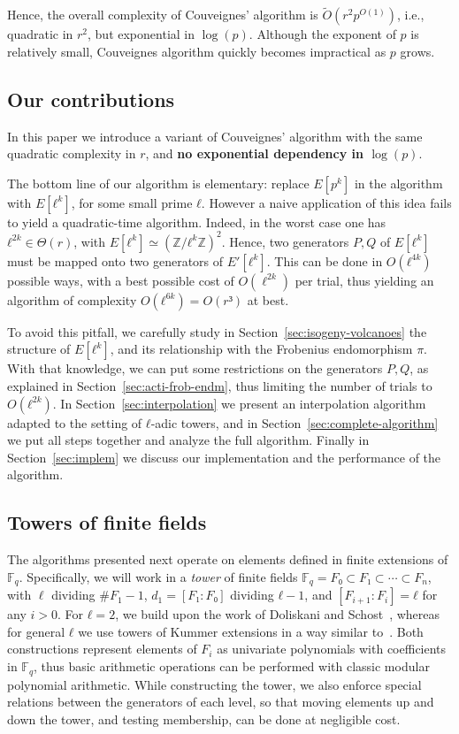 \documentclass{lms}
\newcommand{\F}{\mathbb{F}}
\newcommand{\tildO}{\tilde{O}}
\begin{document}
Hence, the overall complexity of Couveignes' algorithm is
$\tildO(r^2p^{O(1)})$, i.e., quadratic in $r^2$, but exponential in
$\log(p)$. Although the exponent of $p$ is relatively small,
Couveignes algorithm quickly becomes impractical as $p$ grows.

\subsection{Our contributions}

In this paper we
introduce a variant of Couveignes' algorithm with the same quadratic
complexity in $r$, and \textbf{no exponential dependency in $\log(p)$}.

The bottom line of our algorithm is elementary: replace $E[p^k]$ in
the algorithm with $E[ℓ^k]$, for some small prime $ℓ$. However a
naive application of this idea fails to yield a quadratic-time
algorithm. Indeed, in the worst case one has $ℓ^{2k}∈\Theta(r)$, with
$E[ℓ^k]≃(ℤ/ℓ^kℤ)^2$. Hence, two generators $P,Q$ of $E[ℓ^k]$ must
be mapped onto two generators of $E'[ℓ^k]$. This can be done in
$O(ℓ^{4k})$ possible ways, with a best possible cost of $O(\ell^{2k})$
per trial,
thus yielding an
algorithm of complexity $O(ℓ^{6k})=O(r³)$ at best.

To avoid this pitfall, we carefully study
in Section~\ref{sec:isogeny-volcanoes} the structure of
$E[ℓ^k]$, and its relationship with the Frobenius endomorphism $π$.
With that knowledge, we can put some restrictions on the generators $P,Q$,
as explained in Section~\ref{sec:acti-frob-endm},
thus limiting the number of trials to $O(ℓ^{2k})$.
In Section~\ref{sec:interpolation}
we present an interpolation algorithm adapted to the setting of
$ℓ$-adic towers, and in Section~\ref{sec:complete-algorithm} we put
all steps together and analyze the full algorithm. Finally in
Section~\ref{sec:implem} we discuss our implementation and the
performance of the algorithm.



\subsection{Towers of finite fields}
\label{sub:towers}

The algorithms presented next operate on elements defined in finite
extensions of $\F_q$. Specifically, we will work in a \emph{tower} of finite
fields $\F_q=F₀⊂F₁⊂\cdots⊂F_n$, with $\ell$ dividing $\#F_1-1$, $d_1=[F₁:F₀]$
dividing $ℓ-1$, and $[F_{i+1}:F_i]=ℓ$ for any $i>0$. For $ℓ=2$,
we build upon the work of Doliskani and Schost~\cite{DoSc12}, whereas for
general $ℓ$ we use towers of Kummer extensions in a way similar
to~\cite[\S2]{DeDoSc13}.  Both constructions represent elements of
$F_i$ as univariate polynomials with coefficients in $\F_q$, thus
basic arithmetic operations can be performed with classic modular
polynomial arithmetic. While constructing the tower, we also enforce
special relations between the generators of each level, so that moving
elements up and down the tower, and testing membership, can be done at
negligible cost.
\end{document}
